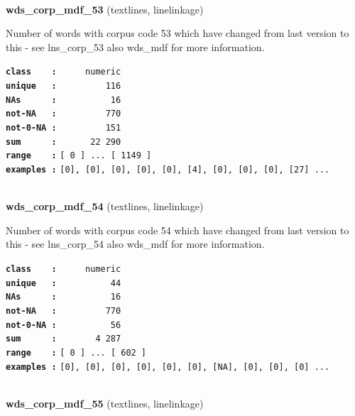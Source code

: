 \documentclass[]{article}
\begin{document}
~

\textbf{wds\_corp\_mdf\_53} (textlines, linelinkage)

Number of words with corpus code 53 which have changed from last version
to this - see lns\_corp\_53 also wds\_mdf for more information.

\textbf{\texttt{class\ \ \ \ :}} \texttt{~~~~~numeric}\\
\textbf{\texttt{unique\ \ \ :}} \texttt{~~~~~~~~~116}\\
\textbf{\texttt{NAs\ \ \ \ \ \ :}} \texttt{~~~~~~~~~~16}\\
\textbf{\texttt{not-NA\ \ \ :}} \texttt{~~~~~~~~~770}\\
\textbf{\texttt{not-0-NA\ :}} \texttt{~~~~~~~~~151}\\
\textbf{\texttt{sum\ \ \ \ \ \ :}} \texttt{~~~~~~22~290}\\
\textbf{\texttt{range\ \ \ \ :}}
\texttt{{[}\ 0\ {]}\ ...\ {[}\ 1149\ {]}}\\
\textbf{\texttt{examples\ :}}
\texttt{{[}0{]},\ {[}0{]},\ {[}0{]},\ {[}0{]},\ {[}0{]},\ {[}4{]},\ {[}0{]},\ {[}0{]},\ {[}0{]},\ {[}27{]}\ ...}\\

~

\textbf{wds\_corp\_mdf\_54} (textlines, linelinkage)

Number of words with corpus code 54 which have changed from last version
to this - see lns\_corp\_54 also wds\_mdf for more information.

\textbf{\texttt{class\ \ \ \ :}} \texttt{~~~~~numeric}\\
\textbf{\texttt{unique\ \ \ :}} \texttt{~~~~~~~~~~44}\\
\textbf{\texttt{NAs\ \ \ \ \ \ :}} \texttt{~~~~~~~~~~16}\\
\textbf{\texttt{not-NA\ \ \ :}} \texttt{~~~~~~~~~770}\\
\textbf{\texttt{not-0-NA\ :}} \texttt{~~~~~~~~~~56}\\
\textbf{\texttt{sum\ \ \ \ \ \ :}} \texttt{~~~~~~~4~287}\\
\textbf{\texttt{range\ \ \ \ :}}
\texttt{{[}\ 0\ {]}\ ...\ {[}\ 602\ {]}}\\
\textbf{\texttt{examples\ :}}
\texttt{{[}0{]},\ {[}0{]},\ {[}0{]},\ {[}0{]},\ {[}0{]},\ {[}0{]},\ {[}NA{]},\ {[}0{]},\ {[}0{]},\ {[}0{]}\ ...}\\

~

\textbf{wds\_corp\_mdf\_55} (textlines, linelinkage)
\end{document}
